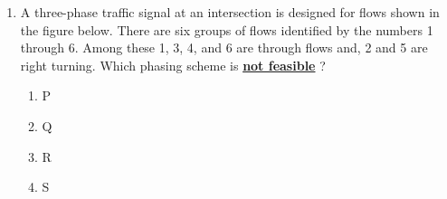 \documentclass[journal]{IEEEtran}
\begin{document}
\begin{enumerate}
\item A three-phase traffic signal at an intersection is designed for flows shown in the figure below. There are six groups of flows identified by the numbers 1 through 6. Among these 1, 3, 4, and 6 are through flows and, 2 and 5 are right turning. Which phasing scheme is \textbf{\underline{not feasible}} ?
 \begin{figure}[!ht]
\centering
\resizebox{0.5\textwidth}{!}{%

}%
\end{figure}
\begin{table}[h!]
  \centering
  
\end{table} 
\begin{enumerate}
    \item P
    \item Q
    \item R
    \item S \\
\end{enumerate}
			 \end{enumerate}
			 
\end{document}

